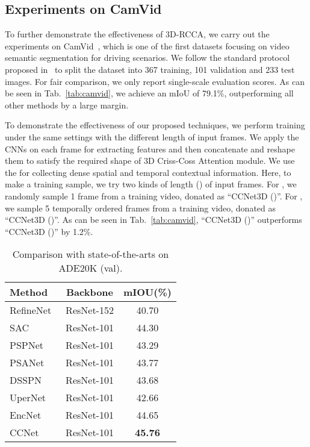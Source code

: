 \documentclass[10pt,journal,compsoc]{IEEEtran}
\begin{document}
\subsection{Experiments on CamVid}

To further demonstrate the effectiveness of 3D-RCCA, we carry out the experiments on CamVid~\cite{brostow2008segmentation}, which is one of the first datasets focusing on video semantic segmentation for driving scenarios. We follow the standard protocol proposed in~\cite{badrinarayanan2017segnet} to split the dataset into 367 training, 101 validation and 233 test images. For fair comparison, we only report single-scale evaluation scores. As can be seen in Tab.~\ref{tab:camvid}, we achieve an mIoU of 79.1\%, outperforming all other methods by a large margin.

To demonstrate the effectiveness of our proposed techniques, we perform training under the same settings with the different length of input frames. We apply the CNNs on each frame for extracting features and then concatenate and reshape them to satisfy the required shape of 3D Criss-Coss Attention module. We use the  for collecting dense spatial and temporal contextual information.
Here, to make a training sample, we try two kinds of length () of input frames. For , we randomly sample 1 frame from a training video, donated as ``CCNet3D ()''. For , we sample 5 temporally ordered frames from a training video, donated as ``CCNet3D ()''. As can be seen in Tab.~\ref{tab:camvid}, ``CCNet3D ()'' outperforms ``CCNet3D ()'' by 1.2\%.


    \begin{table}[!t]
        \renewcommand{\arraystretch}{1.3}
        \setlength{\tabcolsep}{1em}
        \caption{Comparison with state-of-the-arts on ADE20K (val).}
        \label{tab:ade20k}
        \centering \small
        \begin{tabular}{|l|c|c|}
            \hline
            Method & Backbone & mIOU(\%)  \\
            \hline
            RefineNet~\cite{lin2017refinenet} & ResNet-152 & 40.70\\
            SAC~\cite{zhang2017scale} & ResNet-101 & 44.30\\
            PSPNet~\cite{zhao2017pyramid} & ResNet-101 & 43.29 \\
            PSANet~\cite{zhao2018psanet} & ResNet-101 & 43.77 \\
            DSSPN~\cite{liang2018dynamic} & ResNet-101 & 43.68 \\
            UperNet~\cite{xiao2018unified} & ResNet-101 & 42.66 \\
            EncNet~\cite{zhang2018context} & ResNet-101 & 44.65 \\
            \hline
            CCNet & ResNet-101 & \textbf{45.76}\\
            \hline
        \end{tabular}
        
    \end{table}
    
\end{document}
